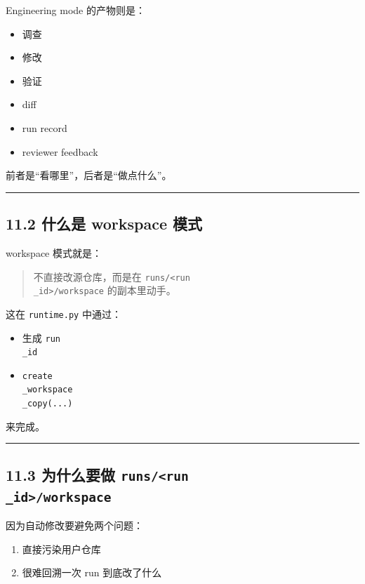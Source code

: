 \documentclass[UTF8,12pt,openany]{ctexbook}
\begin{document}
Engineering mode 的产物则是：\par

\begin{itemize}
\item 调查
\item 修改
\item 验证
\item diff
\item run record
\item reviewer feedback
\end{itemize}

前者是“看哪里”，后者是“做点什么”。\par

\hrule

\subsection{11.2 什么是 workspace 模式}

workspace 模式就是：\par

\begin{quote}
不直接改源仓库，而是在 \texttt{runs/<run\\_id>/workspace} 的副本里动手。
\end{quote}

这在 \texttt{runtime.py} 中通过：\par

\begin{itemize}
\item 生成 \texttt{run\\_id}
\item \texttt{create\\_workspace\\_copy(...)}
\end{itemize}

来完成。\par

\hrule

\subsection{11.3 为什么要做 \texttt{runs/<run\\_id>/workspace}}

因为自动修改要避免两个问题：\par

\begin{enumerate}
\item 直接污染用户仓库
\item 很难回溯一次 run 到底改了什么
\end{enumerate}
\end{document}
